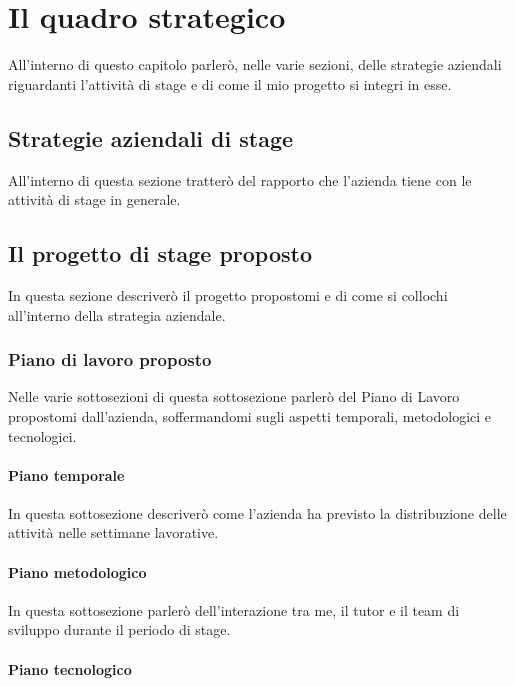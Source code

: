 \newpage
\chapter{Il quadro strategico}
\label{cap:ilquadrostrategico}

All'interno di questo capitolo parlerò, nelle varie sezioni, delle strategie aziendali riguardanti l'attività di stage e di come il mio progetto si integri in esse.

\section{Strategie aziendali di stage}

All'interno di questa sezione tratterò del rapporto che l'azienda tiene con le attività di stage in generale.

\section{Il progetto di stage proposto}

In questa sezione descriverò il progetto propostomi e di come si collochi all'interno della strategia aziendale.

\subsection{Piano di lavoro proposto}

Nelle varie sottosezioni di questa sottosezione parlerò del Piano di Lavoro propostomi dall'azienda, soffermandomi sugli aspetti temporali, metodologici e tecnologici.

\subsubsection{Piano temporale}

In questa sottosezione descriverò come l'azienda ha previsto la distribuzione delle attività nelle settimane lavorative.

\subsubsection{Piano metodologico}

In questa sottosezione parlerò dell'interazione tra me, il tutor e il team di sviluppo durante il periodo di stage.

\subsubsection{Piano tecnologico}

